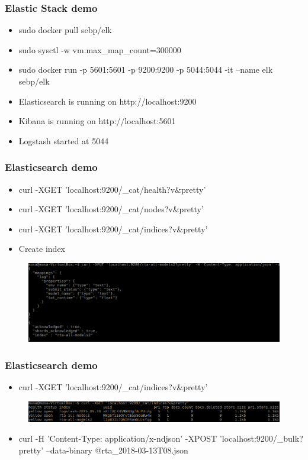 \documentclass[11pt]{beamer}
\begin{document}
\begin{frame}
\frametitle{Elastic Stack demo}
\begin{itemize}
	\item sudo docker pull sebp/elk
	\item sudo sysctl -w vm.max\_map\_count=300000
	\item sudo docker run -p 5601:5601 -p 9200:9200 -p 5044:5044 -it --name elk sebp/elk
	\item Elasticsearch is running on http://localhost:9200
	\item Kibana is running on http://localhost:5601 
	\item Logstash started at 5044
\end{itemize}
\end{frame}

\begin{frame}
\frametitle{Elasticsearch demo}
\begin{itemize}
	\item curl -XGET 'localhost:9200/\_cat/health?v\&pretty’
	\item curl -XGET 'localhost:9200/\_cat/nodes?v\&pretty'
	\item curl -XGET 'localhost:9200/\_cat/indices?v\&pretty’
	\item Create index
\end{itemize}
\begin{figure}[h]
	\includegraphics[scale=.4]{images/es_demo1}
\end{figure}
\end{frame}

\begin{frame}
\frametitle{Elasticsearch demo}
\begin{itemize}
	\item curl -XGET 'localhost:9200/\_cat/indices?v\&pretty’
\end{itemize}
\begin{figure}[h]
	\includegraphics[scale=.4]{images/es_demo2}
\end{figure}
\begin{itemize}
	\item curl -H 'Content-Type: application/x-ndjson' -XPOST 'localhost:9200/\_bulk?pretty' --data-binary @rta\_2018-03-13T08.json
\end{itemize}
\end{frame}
\end{document}

